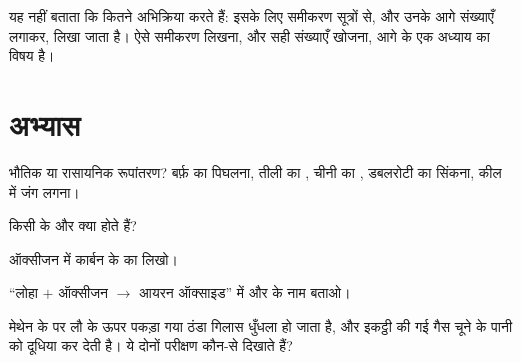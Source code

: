 \begin{remark}[अणुओं को गिनना]\label{rem:g7:chemical-reactions:counting}
 यह नहीं बताता कि कितने  अभिक्रिया करते हैं: इसके लिए
समीकरण सूत्रों से, और उनके आगे संख्याएँ लगाकर, लिखा जाता है। ऐसे समीकरण लिखना,
और सही संख्याएँ खोजना, आगे के एक अध्याय का
विषय है।
\end{remark}

\section{अभ्यास}

\begin{exercise}[$\star$]\label{exo:g7:chemical-reactions:1}
भौतिक या रासायनिक रूपांतरण? बर्फ़ का पिघलना, तीली का , चीनी का
, डबलरोटी का सिंकना, कील में जंग लगना।
\end{exercise}

\begin{exercise}[$\star$]\label{exo:g7:chemical-reactions:2}
किसी  के  और  क्या होते हैं?
\end{exercise}

\begin{exercise}[$\star$]\label{exo:g7:chemical-reactions:3}
ऑक्सीजन में कार्बन के  का  लिखो।
\end{exercise}

\begin{exercise}[$\star$]\label{exo:g7:chemical-reactions:4}
 ``लोहा $+$ ऑक्सीजन $\longrightarrow$ आयरन ऑक्साइड'' में
 और  के नाम बताओ।
\end{exercise}

\begin{exercise}[$\star\star$]\label{exo:g7:chemical-reactions:5}
मेथेन के  पर लौ के ऊपर पकड़ा गया ठंडा गिलास धुँधला हो जाता है, और
इकट्ठी की गई गैस चूने के पानी को दूधिया कर देती है। ये दोनों परीक्षण कौन-से
 दिखाते हैं?
\end{exercise}

